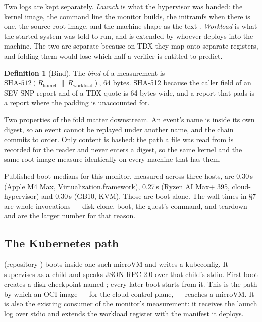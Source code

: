 \documentclass[11pt]{article}
\theoremstyle{definition}
\newtheorem{definition}{Definition}
\begin{document}
Two logs are kept separately. \emph{Launch} is what the hypervisor was handed:
the kernel image, the command line the monitor builds, the initramfs when there
is one, the source root image, and the machine shape as the text
. \emph{Workload} is what the started
system was told to run, and is extended by whoever deploys into the machine.
The two are separate because on TDX they map onto separate registers, and
folding them would lose which half a verifier is entitled to predict.

\begin{definition}[Bind]
\label{def:bind}
The \emph{bind} of a measurement is
$\mathrm{SHA\text{-}512}(R_{\mathrm{launch}} \,\|\, R_{\mathrm{workload}})$, 64
bytes. SHA-512 because the caller field of an SEV-SNP report and of a TDX quote
is 64 bytes wide, and a report that pads is a report where the padding is
unaccounted for.
\end{definition}

Two properties of the fold matter downstream. An event's name is inside its own
digest, so an event cannot be replayed under another name, and the chain commits
to order. Only content is hashed: the path a file was read from is recorded for
the reader and never enters a digest, so the same kernel and the same root image
measure identically on every machine that has them.

Published boot medians for this monitor, measured across three hosts, are
0.30\,s (Apple M4 Max, Virtualization.framework), 0.27\,s (Ryzen AI Max+ 395,
cloud-hypervisor) and 0.30\,s (GB10, KVM). Those are boot alone. The wall times
in §7 are whole invocations --- disk clone, boot, the guest's command, and
teardown --- and are the larger number for that reason.

\subsection{The Kubernetes path}

 (repository ) boots  inside one such
microVM and writes a kubeconfig. It supervises  as a
child and speaks JSON-RPC 2.0 over that child's stdio. First boot creates a disk
checkpoint named ; every later boot starts from it. This is the path by
which an OCI image --- for the cloud control plane, 
--- reaches a microVM. It is also the existing consumer of the monitor's
measurement: it receives the launch log over stdio and extends the workload
register with the manifest it deploys.
\end{document}
